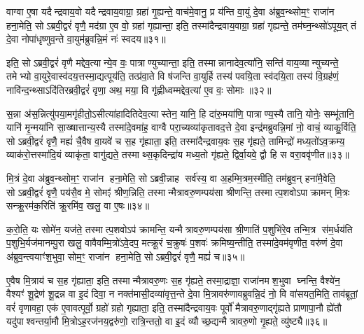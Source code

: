 {\anuvakamend[{त॒ उ॒भयान्गृह्यते॒ चतु॑श्चत्वारिशच्च॥६॥}]}

वाग्वा ए॒षा यदैन्द्रवाय॒वो यदैन्द्रवाय॒वाग्रा॒ ग्रहा॑ गृ॒ह्यन्ते॒ वाच॑मे॒वानु॒ प्र य॑न्ति वा॒युं दे॒वा अ॑ब्रुव॒न्थ्सोम॒ꣳ॒ राजा॑न हना॒मेति॒ सोऽब्रवी॒द्वरं॑ वृणै॒ मद॑ग्रा ए॒व वो॒ ग्रहा॑ गृह्यान्ता॒ इति॒ तस्मा॑दैन्द्रवाय॒वाग्रा॒ ग्रहा॑ गृह्यन्ते॒ तम॑घ्न॒न्थ्सो॑ऽपूय॒त् तं दे॒वा नोपा॑धृष्णुव॒न्ते वा॒युम॑ब्रुवन्नि॒मं नः॑ स्वदय॥३१॥

इति॒ सोऽब्रवी॒द्वरं॑ वृणै मद्देव॒त्यान्ये॒व वः॒ पात्राण्युच्यान्ता॒ इति॒ तस्मान्नानादेव॒त्या॑नि॒ सन्ति॑ वाय॒व्यान्युच्यन्ते॒ तमेभ्यो वा॒युरे॒वास्व॑दय॒त्तस्मा॒द्यत्पूय॑ति॒ तत्प्र॑वा॒ते वि ष॑जन्ति वा॒युर्\mbox{}हि तस्य॑ पवयि॒ता स्व॑दयि॒ता तस्य॑ वि॒ग्रह॑णं॒ नावि॑न्द॒न्थ्साऽदि॑तिरब्रवी॒द्वरं॑ वृणा॒ अथ॒ मया॒ वि गृ॑ह्णीध्वम्मद्देव॒त्या॑ ए॒व वः॒ सोमाः॥३२॥

स॒न्ना अ॑स॒न्नित्यु॑पया॒मगृ॑हीतो॒ऽसीत्या॑हादितिदेव॒त्यास्तेन॒ यानि॒ हि दा॑रु॒मया॑णि॒ पात्राण्य॒स्यै तानि॒ योनेः॒ सम्भू॑तानि॒ यानि॑ मृ॒न्मया॑नि सा॒ख्षात्तान्य॒स्यै तस्मा॑दे॒वमा॑ह॒ वाग्वै परा॒च्यव्या॑कृतावद॒त्ते दे॒वा इन्द्र॑मब्रुवन्नि॒मां नो॒ वाचं॒ व्याकु॒र्विति॒ सोऽब्रवी॒द्वरं॑ वृणै॒ मह्यं॑ चै॒वैष वा॒यवे॑ च स॒ह गृ॑ह्याता॒ इति॒ तस्मा॑दैन्द्रवाय॒वः स॒ह गृ॑ह्यते॒ तामिन्द्रो॑ मध्य॒तो॑ऽव॒क्रम्य॒ व्याक॑रो॒त्तस्मा॑दि॒यं व्याकृ॑ता॒ वागु॑द्यते॒ तस्माथ्स॒कृदिन्द्रा॑य मध्य॒तो गृ॑ह्यते॒ द्विर्वा॒यवे॒ द्वौ हि स वरा॒ववृ॑णीत॥३३॥

{\anuvakamend[{स्व॒द॒य॒ सोमास्स॒हाष्टाविꣳ॑शतिश्च॥७॥}]}

मि॒त्रं दे॒वा अ॑ब्रुव॒न्थ्सोम॒ꣳ॒ राजा॑न हना॒मेति॒ सोऽब्रवी॒न्नाह सर्व॑स्य॒ वा अ॒हम्मि॒त्रम॒स्मीति॒ तम॑ब्रुव॒न् हना॑मै॒वेति॒ सोऽब्रवी॒द्वरं॑ वृणै॒ पय॑सै॒व मे॒ सोमꣵ॑ श्रीण॒न्निति॒ तस्मान्मैत्रावरु॒णम्पय॑सा श्रीणन्ति॒ तस्मात्प॒शवोऽपाक्रामन् मि॒त्रः सन्क्रू॒रम॑क॒रिति॑ क्रू॒रमि॑व॒ खलु॒ वा ए॒षः॥३४॥

क॒रो॒ति॒ यः सोमे॑न॒ यज॑ते॒ तस्मात्प॒शवोऽप॑ क्रामन्ति॒ यन्मैत्रावरु॒णम्पय॑सा श्री॒णाति॑ प॒शुभि॑रे॒व तन्मि॒त्र स॑म॒र्धय॑ति प॒शुभि॒र्यज॑मानम्पु॒रा खलु॒ वावैवम्मि॒त्रो॑ऽवे॒दप॒ मत्क्रू॒रं च॒क्रुषः॑ प॒शवः॑ क्रमिष्य॒न्तीति॒ तस्मा॑दे॒वम॑वृणीत॒ वरु॑णं दे॒वा अ॑ब्रुव॒न्त्वयाꣳ॑श॒भुवा॒ सोम॒ꣳ॒ राजा॑न हना॒मेति॒ सोऽब्रवी॒द्वरं॑ वृणै॒ मह्यं॑ च॥३५॥

ए॒वैष मि॒त्राय॑ च स॒ह गृ॑ह्याता॒ इति॒ तस्मान्मैत्रावरु॒णः स॒ह गृ॑ह्यते॒ तस्मा॒द्राज्ञा॒ राजा॑नमश॒भुवा घ्नन्ति॒ वैश्ये॑न॒ वैश्यꣳ॑ शू॒द्रेण॑ शू॒द्रन्न वा इ॒दं दिवा॒ न नक्त॑मासी॒दव्या॑वृत्त॒न्ते दे॒वा मि॒त्रावरु॑णावब्रुवन्नि॒दं नो॒ वि वा॑सयत॒मिति॒ ताव॑ब्रूतां॒ वरं॑ वृणावहा॒ एक॑ ए॒वावत्पूर्वो॒ ग्रहो॑ ग्रहो गृह्याता॒ इति॒ तस्मा॑दैन्द्रवाय॒वः पूर्वो॑ मैत्रावरु॒णाद्गृ॑ह्यते प्राणापा॒नौ ह्ये॑तौ यदु॑पाश्वन्तर्या॒मौ मि॒त्रोऽह॒रज॑नय॒द्वरु॑णो॒ रात्रि॒न्ततो॒ वा इ॒दं व्यौच्छ॒द्यन्मैत्रावरु॒णो गृ॒ह्यते॒ व्यु॑ष्ट्यै॥३६॥

